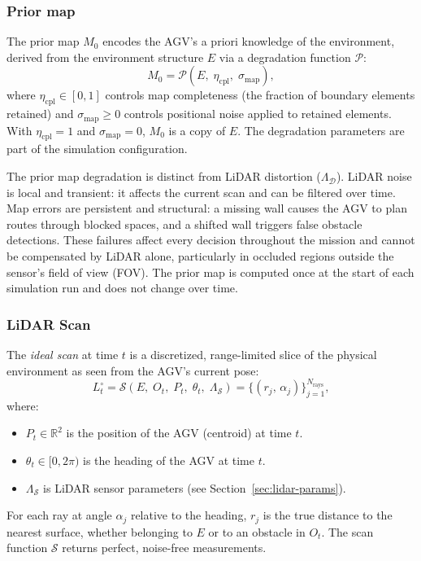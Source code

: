 \documentclass[conference]{IEEEtran}
\begin{document}
\subsubsection{Prior map}
\label{sec:prior-map}
The prior map $M_0$ encodes the AGV's a priori knowledge of the environment, derived from the environment structure $E$ via a degradation function $\mathcal{P}$:
\begin{equation}
\label{eq:perceived-prior-map}
    M_0 = \mathcal{P}(E,\; \eta_{\text{cpl}},\; \sigma_{\text{map}}),
\end{equation}
where $\eta_{\text{cpl}} \in [0,1]$ controls map completeness (the fraction of boundary elements retained) and $\sigma_{\text{map}} \geq 0$ controls positional noise applied to retained elements. With $\eta_{\text{cpl}} = 1$ and $\sigma_{\text{map}} = 0$, $M_0$ is a copy of $E$. The degradation parameters are part of the simulation configuration. 
 
The prior map degradation is distinct from LiDAR distortion ($\Lambda_{\mathcal{D}}$). LiDAR noise is local and transient: it affects the current scan and can be filtered over time. Map errors are persistent and structural: a missing wall causes the AGV to plan routes through blocked spaces, and a shifted wall triggers false obstacle detections. These failures affect every decision throughout the mission and cannot be compensated by LiDAR alone, particularly in occluded regions outside the sensor's field of view (FOV).
The prior map is computed once at the start of each simulation run and does not change over time.
 
\subsubsection{LiDAR Scan}
\label{sec:lidar-Scan}
 
The \emph{ideal scan} at time $t$ is a discretized, range-limited slice of the physical environment as seen from the AGV's current pose:
\begin{equation}
\label{eq:ideal-scan}
    L_t^{\circ} = \mathcal{S}(E,\; O_t,\; P_t,\; \theta_t,\; \Lambda_{\mathcal{S}}) = \{(r_j,\, \alpha_j)\}_{j=1}^{N_{\text{rays}}},
\end{equation}
where:
\begin{itemize}
    \item $P_t \in \mathbb{R}^2$ is the position of the AGV (centroid) at time $t$.
    \item $\theta_t \in [0, 2\pi)$ is the heading of the AGV at time $t$.
    \item $\Lambda_{\mathcal{S}}$ is LiDAR sensor parameters (see Section~\ref{sec:lidar-params}). 
\end{itemize}
For each ray at angle $\alpha_j$ relative to the heading, $r_j$ is the true distance to the nearest surface, whether belonging to $E$ or to an obstacle in $O_t$. The scan function $\mathcal{S}$ returns perfect, noise-free measurements.
 
\end{document}
